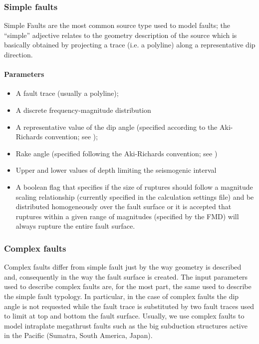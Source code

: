 \subsubsection{Simple faults}
%
Simple Faults are the most common source type used to model faults; the 
``simple'' adjective relates to the geometry description of the source 
which is basically obtained by projecting a trace (i.e. a polyline) along 
a representative dip direction. 
%
\paragraph{Parameters}
%
\begin{itemize}
\item A fault trace (usually a polyline); 
\item A discrete frequency-magnitude distribution
\item A representative value of the dip angle (specified according to 
the Aki-Richards convention; see \citet{aki2002});
\item Rake angle (specified following the Aki-Richards convention; 
see \citet{aki2002}) 
\item Upper and lower values of depth limiting the seismogenic interval 
\item A boolean flag that specifies if the size of ruptures should 
follow a magnitude scaling relationship (currently specified in the 
calculation settings file) and be distributed homogeneously over the 
fault surface or it is accepted that ruptures within a given range of 
magnitudes (specified by the FMD) will always rupture the entire fault 
surface.
\end{itemize}
%
\subsubsection{Complex faults}
%
Complex faults  differ from simple fault just by the way geometry is 
described and, consequently in the way the fault surface is created. The 
input parameters used to describe complex faults are, for the most part, 
the same used to describe the simple fault typology. In particular, in 
the case of complex faults the dip angle is not requested while the fault
trace is substituted by two fault traces used to limit at top and bottom 
the fault surface. 
%
Usually, we use complex faults to model intraplate megathrust faults such 
as the big subduction structures active in the Pacific (Sumatra, South 
America, Japan).

